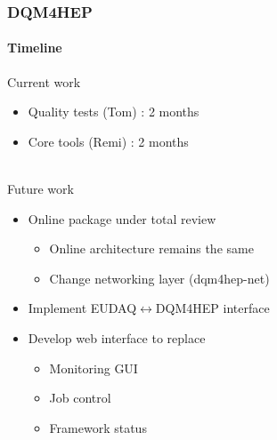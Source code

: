 \documentclass[presentation, 10pt]{beamer}
\begin{document}
\begin{frame}
  \frametitle{DQM4HEP}
  \framesubtitle{Timeline}
  \footnotesize
  Current work \\
  \begin{itemize}
    \item Quality tests (Tom) : 2 months
    \item Core tools (Remi) : 2 months
  \end{itemize}
  ~ \\
  Future work \\
  \begin{itemize}
    \item Online package under total review
    \begin{itemize}
      \scriptsize
      \item Online architecture remains the same
      \item Change networking layer (dqm4hep-net)
    \end{itemize}
    \item Implement EUDAQ$\leftrightarrow$DQM4HEP interface
    \item Develop web interface to replace
    \begin{itemize}
      \scriptsize
      \item Monitoring GUI
      \item Job control
      \item Framework status
    \end{itemize}
  \end{itemize}
\end{frame}

%
\end{document}
